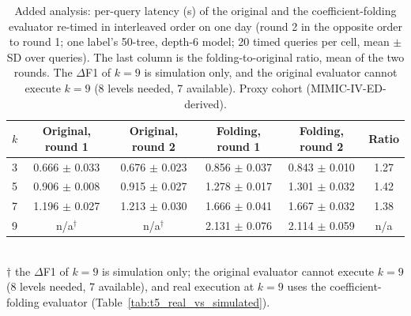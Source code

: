 \begin{table}[t]
\centering
\caption{Added analysis: per-query latency (s) of the original and the coefficient-folding evaluator re-timed in interleaved order on one day (round 2 in the opposite order to round 1; one label's 50-tree, depth-6 model; 20 timed queries per cell, mean $\pm$ SD over queries). The last column is the folding-to-original ratio, mean of the two rounds. The $\Delta$F1 of $k=9$ is simulation only, and the original evaluator cannot execute $k=9$ (8 levels needed, 7 available). Proxy cohort (MIMIC-IV-ED-derived).}
\label{tab:s5_interleaved_latency}
\begin{tabular}{lcccc|c}
\toprule
$k$ & Original, round 1 & Original, round 2 & Folding, round 1 & Folding, round 2 & Ratio \\
\midrule
3 & 0.666 $\pm$ 0.033 & 0.676 $\pm$ 0.023 & 0.856 $\pm$ 0.037 & 0.843 $\pm$ 0.010 & 1.27 \\
5 & 0.906 $\pm$ 0.008 & 0.915 $\pm$ 0.027 & 1.278 $\pm$ 0.017 & 1.301 $\pm$ 0.032 & 1.42 \\
7 & 1.196 $\pm$ 0.027 & 1.213 $\pm$ 0.030 & 1.666 $\pm$ 0.041 & 1.667 $\pm$ 0.032 & 1.38 \\
9 & n/a$^\dagger$ & n/a$^\dagger$ & 2.131 $\pm$ 0.076 & 2.114 $\pm$ 0.059 & n/a \\
\bottomrule
\end{tabular}
\\[2pt]
{\footnotesize $\dagger$ the $\Delta$F1 of $k=9$ is simulation only; the original evaluator cannot execute $k=9$ (8 levels needed, 7 available), and real execution at $k=9$ uses the coefficient-folding evaluator (Table~\ref{tab:t5_real_vs_simulated}).}
\end{table}
